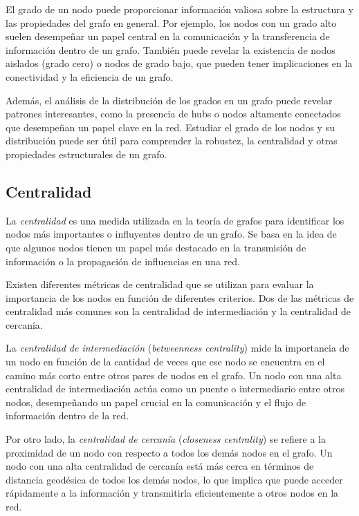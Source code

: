 El grado de un nodo puede proporcionar información valiosa sobre la estructura y las propiedades
del grafo en general. Por ejemplo, los nodos con un grado alto suelen desempeñar un papel central
en la comunicación y la transferencia de información dentro de un grafo. También puede revelar la
existencia de nodos aislados (grado cero) o nodos de grado bajo, que pueden tener implicaciones
en la conectividad y la eficiencia de un grafo.

Además, el análisis de la distribución de los grados en un grafo puede revelar patrones interesantes,
como la presencia de hubs o nodos altamente conectados que desempeñan un papel clave en la red.
Estudiar el grado de los nodos y su distribución puede ser útil para comprender la robustez,
la centralidad y otras propiedades estructurales de un grafo.

\subsection{Centralidad}

La \textit{centralidad} es una medida utilizada en la teoría de grafos para identificar los nodos
más importantes o influyentes dentro de un grafo. Se basa en la idea de que algunos nodos tienen un
papel más destacado en la transmisión de información o la propagación de influencias en una red.

Existen diferentes métricas de centralidad que se utilizan para evaluar la importancia de los
nodos en función de diferentes criterios. Dos de las métricas de centralidad más comunes son la
centralidad de intermediación y la centralidad de cercanía.

La \textit{centralidad de intermediación} (\textit{betweenness centrality}) mide la importancia de
un nodo en función de la cantidad de veces que ese nodo se encuentra en el camino más corto entre
otros pares de nodos en el grafo. Un nodo con una alta centralidad de intermediación actúa como un
puente o intermediario entre otros nodos, desempeñando un papel crucial en la comunicación y el
flujo de información dentro de la red.

Por otro lado, la \textit{centralidad de cercanía} (\textit{closeness centrality}) se refiere a la
proximidad de un nodo con respecto a todos los demás nodos en el grafo. Un nodo con una alta
centralidad de cercanía está más cerca en términos de distancia geodésica de todos los demás nodos,
lo que implica que puede acceder rápidamente a la información y transmitirla eficientemente a otros
nodos en la red.

